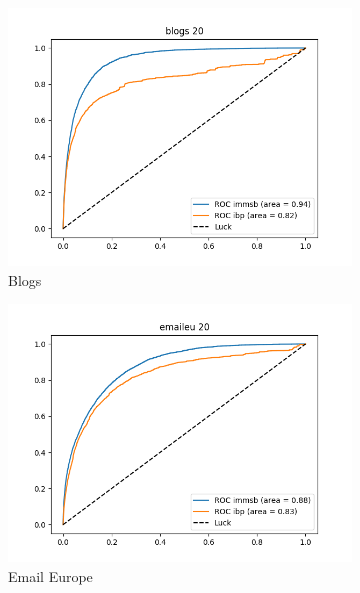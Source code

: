 \begin{figure}[h]
\begin{subfigure}[b]{0.300\textwidth}
            \includegraphics[width=\textwidth]{img/corpus/roc_blogs_20}
            \caption {{\small Blogs}}    
            \label{fig:mean and std of net14}
        \end{subfigure}
        \begin{subfigure}[b]{0.300\textwidth}
            \centering
            \includegraphics[width=\textwidth]{img/corpus/roc_emaileu_20}
            \caption {{\small Email Europe}}    
            \label{fig:mean and std of net14}
        \end{subfigure}
        \begin{subfigure}[b]{0.300\textwidth}
            \centering

\end{subfigure}
\end{figure}
